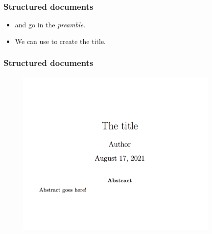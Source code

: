 \begin{frame}[fragile]
\frametitle{Structured documents}
\begin{itemize}
\item \color{blue}{\verb|\title|} \color{black}and \color{blue}{\verb|\author|} \color{black} go in the \textit{preamble}.\\
\item We can use \color{blue}{\verb|\maketitle|} \color{black} to create the title. \\
\end{itemize}
\begin{framed}
\begin{minipage}[b]{0.4\textwidth}
\end{minipage}%
\end{framed}
\end{frame}

\begin{frame}[fragile]
\frametitle{Structured documents}
\begin{figure}
\includegraphics[width=100mm]{figures/example.png}
\end{figure}
\end{frame}


